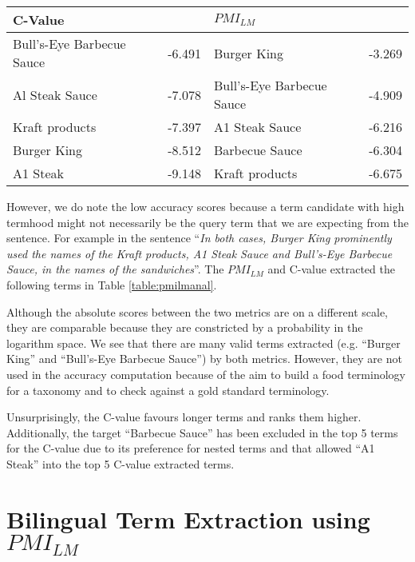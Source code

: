 \begin{table*}[ht!]
\centering
    \begin{tabular}{ll|ll}
     \textbf{C-Value}                  & ~      & $PMI_{LM}$                      & ~      \\ \hline
    Bull’s-Eye Barbecue Sauce & -6.491 & Burger King              & -3.269 \\
    Al Steak Sauce            & -7.078 & Bull’s-Eye Barbecue Sauce & -4.909 \\
    Kraft products            & -7.397 & A1 Steak Sauce            & -6.216 \\
    Burger King               & -8.512 & Barbecue Sauce            & -6.304 \\
    A1 Steak                  & -9.148 & Kraft products            & -6.675 \\
    \end{tabular}
    \caption{An Example Output of Ranked Term Candidates and Metrics Scores}
\label{table:pmilmanal}
\end{table*}

However, we do note the low accuracy scores because a term candidate with high termhood might not necessarily be the query term that we are expecting from the sentence. For example in the sentence “\textit{In both cases, Burger King prominently used the names of the Kraft products, A1 Steak Sauce and Bull's-Eye Barbecue Sauce, in the names of the sandwiches}”. The $PMI_{LM}$ and C-value extracted the following terms in Table \ref{table:pmilmanal}.

Although the absolute scores between the two metrics are on a different scale, they are comparable because they are constricted by a probability in the logarithm space. We see that there are many valid terms extracted (e.g. “Burger King” and “Bull’s-Eye Barbecue Sauce”) by both metrics. However, they are not used in the accuracy computation because of the aim to build a food terminology for a taxonomy and to check against a gold standard terminology. 

Unsurprisingly, the C-value favours longer terms and ranks them higher. Additionally, the target “Barbecue Sauce” has been excluded in the top 5 terms for the C-value due to its preference for nested terms and that allowed “A1 Steak” into the top 5 C-value extracted terms.

\section{Bilingual Term Extraction using $PMI_{LM}$}

